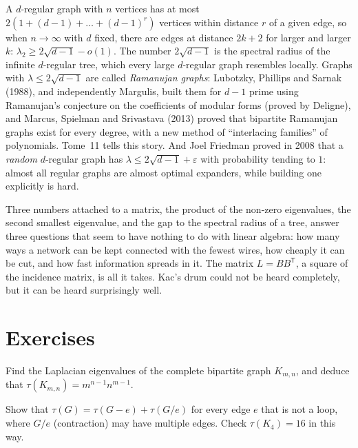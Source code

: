 A $d$-regular graph with $n$ vertices has at most $2(1+(d-1)+\dots+(d-1)^r)$ vertices within distance $r$ of a given edge, so when $n\to\infty$ with $d$ fixed, there are edges at distance $2k+2$ for larger
and larger $k$: $\lambda_2\ge2\sqrt{d-1}-o(1)$. The number $2\sqrt{d-1}$ is the spectral radius of the infinite $d$-regular tree, which every large $d$-regular graph resembles locally. Graphs with
$\lambda\le2\sqrt{d-1}$ are called \emph{Ramanujan graphs}: Lubotzky, Phillips and Sarnak (1988), and independently Margulis, built them for $d-1$ prime using Ramanujan's conjecture on the
coefficients of modular forms (proved by Deligne), and Marcus, Spielman and Srivastava (2013) proved that bipartite Ramanujan graphs exist for every degree, with a new method of ``interlacing
families'' of polynomials. Tome~11 tells this story. And Joel Friedman proved in 2008 that a \emph{random} $d$-regular graph has $\lambda\le2\sqrt{d-1}+\varepsilon$ with probability tending to $1$: almost all
regular graphs are almost optimal expanders, while building one explicitly is hard.

\begin{beauty}
Three numbers attached to a matrix, the product of the non-zero eigenvalues, the second smallest eigenvalue, and the gap to the spectral radius of a tree, answer three questions
that seem to have nothing to do with linear algebra: how many ways a network can be kept connected with the fewest wires, how cheaply it can be cut, and how fast information
spreads in it. The matrix $L=BB^{\mathsf T}$, a square of the incidence matrix, is all it takes. Kac's drum could not be heard completely, but it can be heard surprisingly well.
\end{beauty}

\section{Exercises}

\begin{exercise}[$\star$]\label{ex:kmntrees}
Find the Laplacian eigenvalues of the complete bipartite graph $K_{m,n}$, and deduce that $\tau(K_{m,n})=m^{n-1}n^{m-1}$.
\end{exercise}

\begin{exercise}[$\star$]\label{ex:delcontrees}
Show that $\tau(G)=\tau(G-e)+\tau(G/e)$ for every edge $e$ that is not a loop, where $G/e$ (contraction) may have multiple edges. Check $\tau(K_4)=16$ in this way.
\end{exercise}

